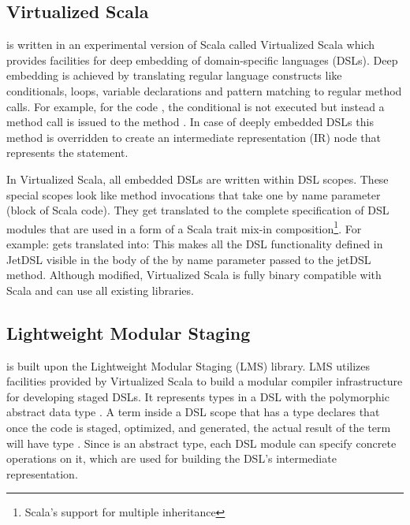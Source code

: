 \subsection{Virtualized Scala}
\label{subsec:virtualized-scala}
\tool is written in an experimental version of Scala called Virtualized Scala
\cite{moors_scala-virtualized_2012} which provides facilities for deep embedding
of domain-specific languages (DSLs). Deep embedding is achieved by translating
regular language constructs like conditionals, loops, variable declarations and
pattern matching to regular method calls. For example, for the code , the conditional is not executed but instead a method call is issued
to the method . In case of deeply
embedded DSLs this method is overridden to create an intermediate
representation (IR) node that represents the  statement.

In Virtualized Scala, all embedded DSLs are written within DSL scopes. These
special scopes look like method invocations that take one by name parameter
(block of Scala code). They get translated to the complete specification of DSL
modules that are used in a form of a Scala trait mix-in
composition\footnote[1]{Scala's support for multiple inheritance}. For example:
 gets translated into:
This makes all the DSL functionality defined in JetDSL visible in the body of
the by name parameter passed to the jetDSL method.
Although modified, Virtualized Scala is fully binary compatible with Scala and
can use all existing libraries.


\subsection{Lightweight Modular Staging}
\label{subsec:lightweight-modular-staging}

\tool is built upon the Lightweight Modular Staging (LMS) library. LMS utilizes
facilities provided by Virtualized Scala to build a modular compiler
infrastructure for developing staged DSLs. It represents types in a DSL with the
polymorphic abstract data type . A term inside a DSL scope that has
a type  declares that once the code is staged, optimized, and
generated, the actual result of the term will have type . Since
 is an abstract type, each DSL module can specify concrete
operations on it, which are used for building the DSL's intermediate
representation.

